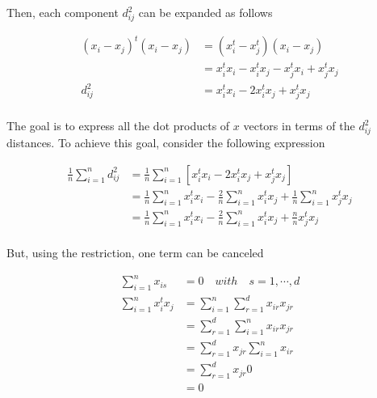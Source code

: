 \documentclass[12pt,journal]{IEEEtran}
\begin{document}
    Then, each component $d_{ij}^2$ can be expanded as follows

    \begin{equation*}
        \begin{aligned}
            (x_i-x_j)^t (x_i-x_j) &= (x_i^t-x_j^t) (x_i-x_j)\\
                                  &= x_i^t x_i - x_i^t x_j - x_j^t x_i + x_j^t x_j\\
                         d_{ij}^2 &= x_i^t x_i - 2 x_i^t x_j + x_j^t x_j\\
        \end{aligned}
    \end{equation*}

    The goal is to express all the dot products of $x$ vectors in terms of the
    $d_{ij}^2$ distances. To achieve this goal, consider the following expression

    \begin{equation*}
        \begin{aligned}
            \frac{1}{n} \sum_{i=1}^n d_{ij}^2 &= \frac{1}{n} \sum_{i=1}^n [x_i^t x_i - 2 x_i^t x_j + x_j^t x_j]\\
            &=  \frac{1}{n} \sum_{i=1}^n x_i^t x_i - \frac{2}{n} \sum_{i=1}^n x_i^t x_j + \frac{1}{n} \sum_{i=1}^n x_j^t x_j\\
            &=  \frac{1}{n} \sum_{i=1}^n x_i^t x_i - \frac{2}{n} \sum_{i=1}^n x_i^t x_j + \frac{n}{n} x_j^t x_j \\
        \end{aligned}
    \end{equation*}

    But, using the restriction, one term can be canceled

    \begin{equation*}
        \begin{aligned}
              \sum_{i=1}^n x_{is} &= 0 \quad with \quad s = 1, \cdots, d\\
            \sum_{i=1}^n x_i^t x_j &= \sum_{i=1}^n \sum_{r=1}^d x_{ir} x_{jr}\\
                                   &= \sum_{r=1}^d \sum_{i=1}^n x_{ir} x_{jr}\\
                                   &= \sum_{r=1}^d x_{jr} \sum_{i=1}^n x_{ir}\\
                                   &= \sum_{r=1}^d x_{jr} 0\\
                                   &= 0\\
        \end{aligned}
    \end{equation*}
\end{document}
